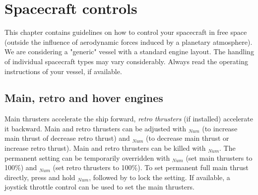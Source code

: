 \documentclass[Orbiter User Manual.tex]{subfiles}
\begin{document}
\section{Spacecraft controls}
This chapter contains guidelines on how to control your spacecraft in free space (outside the influence of aerodynamic forces induced by a planetary atmosphere). We are considering a "generic" vessel with a standard engine layout. The handling of individual spacecraft types may vary considerably. Always read the operating instructions of your vessel, if available.

\subsection{Main, retro and hover engines}
Main thrusters accelerate the ship forward, \textit{retro thrusters} (if installed) accelerate it backward. Main and retro thrusters can be adjusted with \Ctrl\keystroke{+}$_{Num}$ (to increase main thrust of decrease retro thrust) and \Ctrl\keystroke{-}$_{Num}$ (to decrease main thrust or increase retro thrust). Main and retro thrusters can be killed with \Ctrl\keystroke{*}$_{Num}$. The permanent setting can be temporarily overridden with \keystroke{+}$_{Num}$ (set main thrusters to 100\%) and \keystroke{-}$_{Num}$ (set retro thrusters to 100\%). To set permanent full main thrust directly, press and hold \keystroke{+}$_{Num}$, followed by \Ctrl to lock the setting. If available, a joystick throttle control can be used to set the main thrusters.
\end{document}
